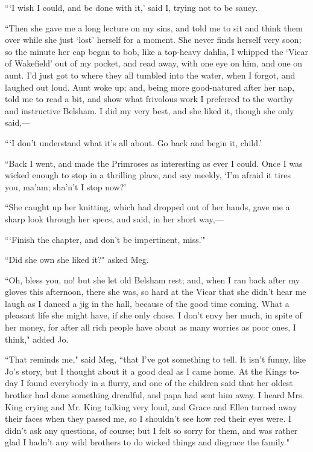 ```I wish I could, and be done with it,'
said I, trying not to be saucy.

``Then she gave me a long lecture on my sins, and told me to sit and
think them over while she just `lost'
herself for a moment. She never finds herself very soon; so the minute
her cap began to bob, like a top-heavy dahlia, I whipped the
`Vicar of Wakefield' out of my pocket,
and read away, with one eye on him, and one on aunt. I'd
just got to where they all tumbled into the water, when I forgot, and
laughed out loud. Aunt woke up; and, being more good-natured after her
nap, told me to read a bit, and show what frivolous work I preferred to
the worthy and instructive Belsham. I did my very best, and she liked
it, though she only said,---

```I don't understand what
it's all about. Go back and begin it,
child.'

``Back I went, and made the Primroses as interesting as ever I could.
Once I was wicked enough to stop in a thrilling place, and say meekly,
`I'm afraid it tires you,
ma'am; sha'n't I stop
now?'

``She caught up her knitting, which had dropped out of her hands, gave me
a sharp look through her specs, and said, in her short way,---

```Finish the chapter, and don't be
impertinent, miss.'"

``Did she own she liked it?" asked Meg.

``Oh, bless you, no! but she let old Belsham rest; and, when I ran back
after my gloves this afternoon, there she was, so hard at the Vicar that
she didn't hear me laugh as I danced a jig in the hall,
because of the good time coming. What a pleasant life she might have, if
she only chose. I don't envy her much, in spite of her
money, for after all rich people have about as many worries as poor
ones, I think," added Jo.

``That reminds me," said Meg, ``that I've got something to
tell. It isn't funny, like Jo's story,
but I thought about it a good deal as I came home. At the Kings to-day I
found everybody in a flurry, and one of the children said that her
oldest brother had done something dreadful, and papa had sent him away.
I heard Mrs. King crying and Mr. King talking very loud, and Grace and
Ellen turned away their faces when they passed me, so I
shouldn't see how red their eyes were. I
didn't ask any questions, of course; but I felt so sorry
for them, and was rather glad I hadn't any wild brothers
to do wicked things and disgrace the family."

